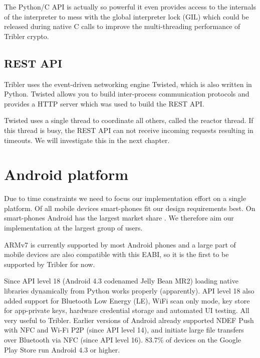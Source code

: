 The Python/C API is actually so powerful it even provides access to the internals of the interpreter to mess with the global interpreter lock (GIL) which could be released during native C calls to improve the multi-threading performance of Tribler crypto.


\subsection{REST API}
Tribler uses the event-driven networking engine Twisted, which is also written in Python.
Twisted allows you to build inter-process communication protocols and provides a HTTP server which was used to build the REST API.

Twisted uses a single thread to coordinate all others, called the reactor thread.
If this thread is busy, the REST API can not receive incoming requests resulting in timeouts.
We will investigate this in the next chapter.


\section{Android platform}
Due to time constraints we need to focus our implementation effort on a single platform.
Of all mobile devices smart-phones fit our design requirements best.
On smart-phones Android has the largest market share \cite{https://www.statista.com/statistics/266136/global-market-share-held-by-smartphone-operating-systems/}.
We therefore aim our implementation at the largest group of users.

ARMv7 is currently supported by most Android phones and a large part of mobile devices are also compatible with this EABI, so it is the first to be supported by Tribler for now.

Since API level 18 (Android 4.3 codenamed Jelly Bean MR2) loading native libraries dynamically from Python works properly (apparently).
API level 18 also added support for Bluetooth Low Energy (LE), WiFi scan only mode, key store for app-private keys, hardware credential storage and automated UI testing.
All very useful to Tribler.
Earlier versions of Android already supported NDEF Push with NFC and Wi-Fi P2P (since API level 14), and initiate large file transfers over Bluetooth via NFC (since API level 16).
83.7\% of devices on the Google Play Store run Android 4.3 or higher.


